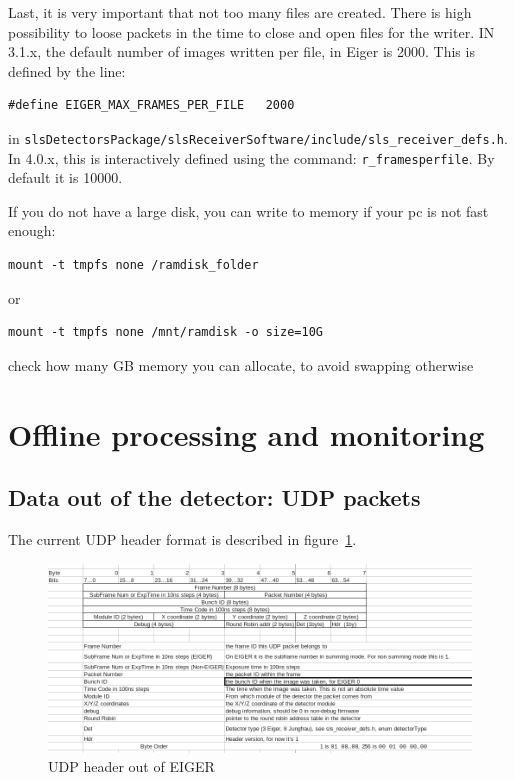 \documentclass{article}
\begin{document}
{{{Last, it is very important that not too many files are created. There is high possibility to loose packets in the time to close and open files for the writer. IN 3.1.x, the default number of images written per file, in Eiger is 2000. This is defined by the line:
\begin{verbatim}
#define EIGER_MAX_FRAMES_PER_FILE	2000
\end{verbatim}
in {\tt{slsDetectorsPackage/slsReceiverSoftware/include/sls\_receiver\_defs.h}}. In 4.0.x, this is interactively defined using the command: {\tt{r\_framesperfile}}. By default it is 10000.  

If you do not have a large disk, you can write to memory if your pc is not fast enough:
\begin{verbatim}
mount -t tmpfs none /ramdisk_folder
\end{verbatim}
or 
\begin{verbatim}
mount -t tmpfs none /mnt/ramdisk -o size=10G
\end{verbatim}
check how many GB memory you can allocate, to avoid swapping otherwise

\section{Offline processing and monitoring}

\subsection{Data out of the detector: UDP packets}\label{UDP}

The current UDP header format is described in figure~\ref{UDPheader}.
\begin{figure}[t]
\begin{center}
\includegraphics[width=1.2\textwidth]{EIGERUDPHeader}
\end{center}
\caption{UDP header out of EIGER}
\label{UDPheader}
\end{figure}
 
}}}
\end{document}
